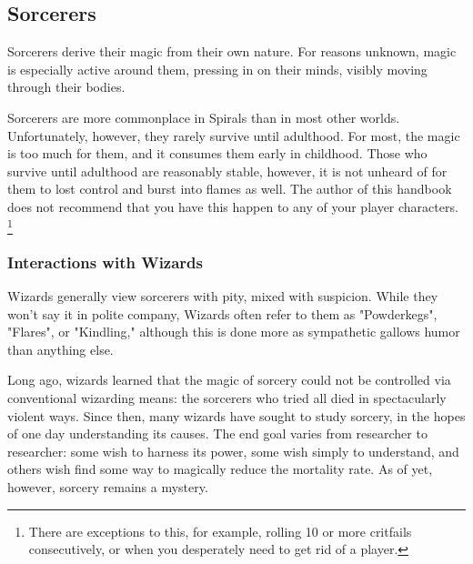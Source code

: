 \begin{multicols}{2}
\subsection{Sorcerers}
Sorcerers derive their magic from their own nature.
For reasons unknown, magic is especially active around them, pressing in on their minds, visibly moving through their bodies.

Sorcerers are more commonplace in Spirals than in most other worlds.
Unfortunately, however, they rarely survive until adulthood.
For most, the magic is too much for them, and it consumes them early in childhood.
Those who survive until adulthood are reasonably stable, however, it is not unheard of for them to lost control and burst into flames as well.
The author of this handbook does not recommend that you have this happen to any of your player characters.
\footnote{There are exceptions to this, for example, rolling 10 or more critfails consecutively, or when you desperately need to get rid of a player.}



\subsubsection{Interactions with Wizards}
Wizards generally view sorcerers with pity, mixed with suspicion.
While they won't say it in polite company, Wizards often refer to them as "Powderkegs", "Flares", or "Kindling," although this is done more as sympathetic gallows humor than anything else.

Long ago, wizards learned that the magic of sorcery could not be controlled via conventional wizarding means: the sorcerers who tried all died in spectacularly violent ways.
Since then, many wizards have sought to study sorcery, in the hopes of one day understanding its causes.
The end goal varies from researcher to researcher: some wish to harness its power, some wish simply to understand, and others wish find some way to magically reduce the mortality rate.
As of yet, however, sorcery remains a mystery.





\end{multicols}